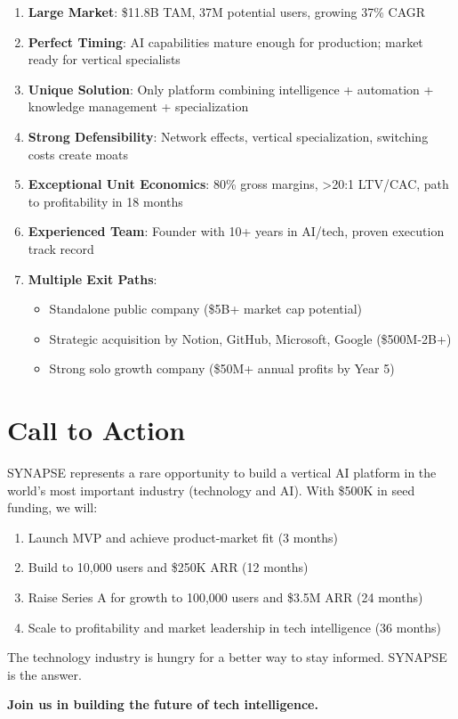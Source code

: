 \documentclass{report}
\begin{document}
\begin{enumerate}
    \item \textbf{Large Market}: \$11.8B TAM, 37M potential users, growing 37\% CAGR
    
    \item \textbf{Perfect Timing}: AI capabilities mature enough for production; market ready for vertical specialists
    
    \item \textbf{Unique Solution}: Only platform combining intelligence + automation + knowledge management + specialization
    
    \item \textbf{Strong Defensibility}: Network effects, vertical specialization, switching costs create moats
    
    \item \textbf{Exceptional Unit Economics}: 80\% gross margins, >20:1 LTV/CAC, path to profitability in 18 months
    
    \item \textbf{Experienced Team}: Founder with 10+ years in AI/tech, proven execution track record
    
    \item \textbf{Multiple Exit Paths}:
    \begin{itemize}
        \item Standalone public company (\$5B+ market cap potential)
        \item Strategic acquisition by Notion, GitHub, Microsoft, Google (\$500M-2B+)
        \item Strong solo growth company (\$50M+ annual profits by Year 5)
    \end{itemize}
\end{enumerate}

\section{Call to Action}

SYNAPSE represents a rare opportunity to build a vertical AI platform in the world's most important industry (technology and AI). With \$500K in seed funding, we will:

\begin{enumerate}
    \item Launch MVP and achieve product-market fit (3 months)
    \item Build to 10,000 users and \$250K ARR (12 months)
    \item Raise Series A for growth to 100,000 users and \$3.5M ARR (24 months)
    \item Scale to profitability and market leadership in tech intelligence (36 months)
\end{enumerate}

The technology industry is hungry for a better way to stay informed. SYNAPSE is the answer.

\begin{center}
\Large\textbf{Join us in building the future of tech intelligence.}
\end{center}
\end{document}
